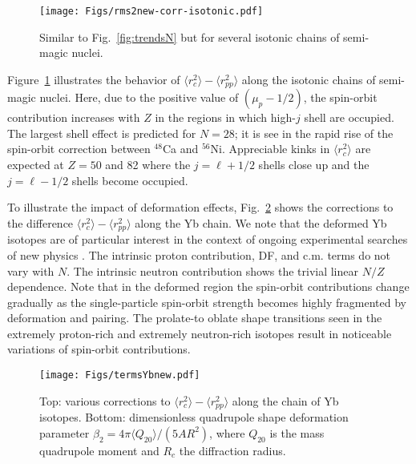 \documentclass[aps,prc,twocolumn,floatfix,nofootinbib,preprintnumbers,superscriptaddress,longbibliography]{revtex4-1}
\begin{document}
\begin{figure}[htb]
\texttt{[image: Figs/rms2new-corr-isotonic.pdf]}
\caption{Similar to Fig.~\ref{fig:trendsN} but for several isotonic chains of semi-magic nuclei.}
\label{fig:trendsZ}
\end{figure}



Figure~\ref{fig:trendsZ} illustrates the behavior of $\langle r^2_c\rangle -\langle r^2_{pp}\rangle$ along the isotonic chains
of semi-magic nuclei. Here, due to the positive value of $(\mu_p-1/2)$,  the spin-orbit contribution increases with $Z$ in the regions in which  high-$j$ shell are occupied.
The largest shell effect is predicted for $N=28$; it is see in the rapid rise of the spin-orbit correction between $^{48}$Ca and 
$^{56}$Ni.
Appreciable kinks in $\langle r^2_c\rangle$ are expected at $Z=50$ and 82 where the $j=\ell+1/2$ shells close up  and   the $j=\ell-1/2$ shells become occupied.


To illustrate the impact of deformation effects, Fig.~\ref{fig:termsYb} shows  the corrections to the difference $\langle r^2_c\rangle -\langle r^2_{pp}\rangle$ along the Yb chain.
We note that 
 the deformed Yb isotopes are of particular interest in the context of ongoing experimental searches of new physics
\cite{Counts2020}. 
The intrinsic proton contribution, DF, and c.m. terms do not vary with $N$. The intrinsic neutron contribution shows the trivial linear $N/Z$ dependence. 
Note that in the deformed region the spin-orbit contributions change  gradually as the single-particle spin-orbit strength becomes highly fragmented by deformation and pairing. The prolate-to oblate shape transitions seen in the extremely proton-rich and extremely neutron-rich isotopes result in noticeable variations of spin-orbit contributions.

\begin{figure}[htb]
\texttt{[image: Figs/termsYbnew.pdf]}
\caption{Top: various corrections to $\langle r^2_c\rangle -\langle r^2_{pp}\rangle$ along
the chain of Yb isotopes. Bottom:  dimensionless quadrupole
shape deformation parameter $\beta_2=4\pi\langle Q_{20}\rangle/(5AR^2)$, where $Q_{20}$ is the mass quadrupole moment and $R_c$ the diffraction radius.
}
\label{fig:termsYb}
\end{figure}
\end{document}
